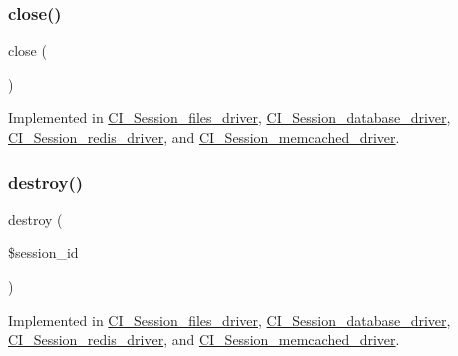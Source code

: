 \subsubsection{\texorpdfstring{close()}{close()}}
{\footnotesize\ttfamily close (\begin{DoxyParamCaption}{ }\end{DoxyParamCaption})}



Implemented in \mbox{\hyperlink{class_c_i___session__files__driver_aa69c8bf1f1dcf4e72552efff1fe3e87e}{C\+I\+\_\+\+Session\+\_\+files\+\_\+driver}}, \mbox{\hyperlink{class_c_i___session__database__driver_aa69c8bf1f1dcf4e72552efff1fe3e87e}{C\+I\+\_\+\+Session\+\_\+database\+\_\+driver}}, \mbox{\hyperlink{class_c_i___session__redis__driver_aa69c8bf1f1dcf4e72552efff1fe3e87e}{C\+I\+\_\+\+Session\+\_\+redis\+\_\+driver}}, and \mbox{\hyperlink{class_c_i___session__memcached__driver_aa69c8bf1f1dcf4e72552efff1fe3e87e}{C\+I\+\_\+\+Session\+\_\+memcached\+\_\+driver}}.

\mbox{\label{interface_session_handler_interface_aaec5812f6b4eb6835f88d3baa06a002a}} 
\subsubsection{\texorpdfstring{destroy()}{destroy()}}
{\footnotesize\ttfamily destroy (\begin{DoxyParamCaption}\item[{}]{\$session\+\_\+id }\end{DoxyParamCaption})}



Implemented in \mbox{\hyperlink{class_c_i___session__files__driver_aaec5812f6b4eb6835f88d3baa06a002a}{C\+I\+\_\+\+Session\+\_\+files\+\_\+driver}}, \mbox{\hyperlink{class_c_i___session__database__driver_aaec5812f6b4eb6835f88d3baa06a002a}{C\+I\+\_\+\+Session\+\_\+database\+\_\+driver}}, \mbox{\hyperlink{class_c_i___session__redis__driver_aaec5812f6b4eb6835f88d3baa06a002a}{C\+I\+\_\+\+Session\+\_\+redis\+\_\+driver}}, and \mbox{\hyperlink{class_c_i___session__memcached__driver_aaec5812f6b4eb6835f88d3baa06a002a}{C\+I\+\_\+\+Session\+\_\+memcached\+\_\+driver}}.

\mbox{\label{interface_session_handler_interface_a57aff7ee0656d8aa75d545fb8b3ae35d}} 
